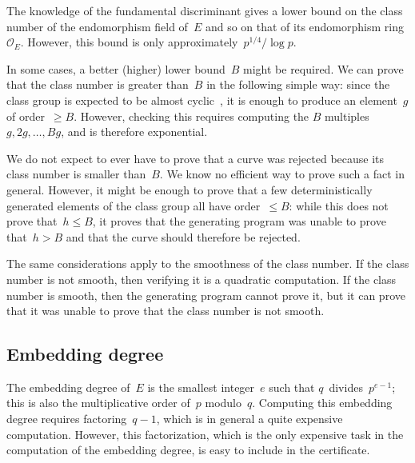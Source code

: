 \documentclass[twocolumn,letterpaper,10pt]{article}
\let\ro\mathcal
\begin{document}
The knowledge of the fundamental discriminant gives a lower bound
on the class number of the endomorphism field of~$E$
and so on that of its endomorphism ring~$\ro O_E$.
However, this bound is only approximately~$p^{1/4}/\log p$.

\smallskip

In some cases, a better (higher) lower bound~$B$ might be required.
We can prove that the class number is greater than~$B$
in the following simple way:
since the class group is expected to be almost cyclic~\cite{nt1984cl},
it is enough to produce an element~$g$ of order~$≥ B$.
However, checking this requires
computing the $B$ multiples~$g, 2g, …, B g$,
and is therefore exponential.

We do not expect to ever have to prove that a curve was rejected
because its class number is smaller than~$B$.
We know no efficient way to prove such a fact in general.
However, it might be enough to prove
that a few deterministically generated elements of the class group
all have order~$≤ B$:
while this does not prove that~$h ≤ B$,
it proves that the generating program was unable to prove that~$h > B$
and that the curve should therefore be rejected.

\smallskip

The same considerations apply to the smoothness of the class number.
If the class number is not smooth, then
verifying it is a quadratic computation.
If the class number is smooth, then
the generating program cannot prove it,
but it can prove that it was unable to prove that
the class number is not smooth.




\subsection{Embedding degree}

The embedding degree of~$E$ is the smallest integer~$e$
such that $q$~divides~$p^{e-1}$;
this is also the multiplicative order of~$p$ modulo~$q$.
Computing this embedding degree requires factoring~$q-1$,
which is in general a quite expensive computation.
However, this factorization, which is the only expensive task
in the computation of the embedding degree,
is easy to include in the certificate.
\end{document}
